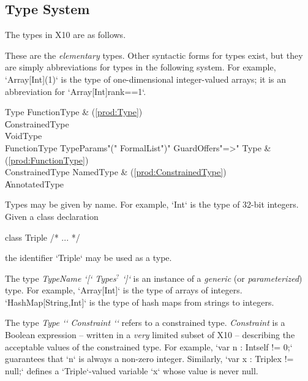 \subsection{Type System}
The types in X10 are as follows.  

These are the {\em elementary} types. Other
syntactic forms for types exist, but they are simply abbreviations for types
in the following system.  For example, \xcd`Array[Int](1)` is the type of
one-dimensional integer-valued arrays; it is an abbreviation for
\xcd`Array[Int]{rank==1}`.\\


\begin{bbgrammar}
                Type \: FunctionType & (\ref{prod:Type}) \\
                     \| ConstrainedType \\
                     \| VoidType \\
        FunctionType \: TypeParams\opt \xcd"(" FormalList\opt \xcd")" Guard\opt Offers\opt \xcd"=>" Type & (\ref{prod:FunctionType}) \\
     ConstrainedType \: NamedType & (\ref{prod:ConstrainedType}) \\
                     \| AnnotatedType \\
\end{bbgrammar}


Types may be given by name. 
For example, 
\xcd`Int`
is the type of 32-bit integers.
Given a class declaration 
\begin{xten}
class Triple { /* ... */ }
\end{xten}
%
the identifier \xcd`Triple` may be used as a type.

The type {\em TypeName \xcd`[` Types{$^?$} \xcd`]`} is an instance of
a {\em generic} (or {\em parameterized}) type. 
 For example,
\xcd`Array[Int]` is the type of arrays of integers. 
\xcd`HashMap[String,Int]` is the type of hash maps from strings to
integers.

The type {\em Type \xcd`{` Constraint \xcd`}`} refers to a constrained type.
{\em Constraint} is a Boolean expression -- written in a {\em very} limited
subset of X10 -- describing the acceptable values of the constrained type.
For example, \xcd`var n : Int{self != 0};` guarantees that \xcd`n` is always a
non-zero integer. 
Similarly, \xcd`var x : Triple{x != null};` defines a \xcd`Triple`-valued
variable \xcd`x` whose value is never null.

